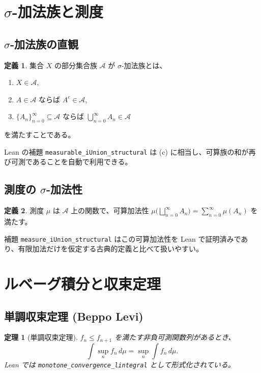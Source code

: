 \documentclass[a4paper]{ltjsarticle}
\theoremstyle{definition}
\newtheorem{definition}{定義}[section]
\theoremstyle{plain}
\newtheorem{theorem}{定理}[section]
\begin{document}
\section{$\sigma$-加法族と測度}

\subsection{$\sigma$-加法族の直観}
\begin{definition}
集合 $X$ の部分集合族 $\mathcal{A}$ が $\sigma$-加法族とは、
\begin{enumerate}[label=\textup{(\alph*)}]
  \item $X \in \mathcal{A}$,
  \item $A \in \mathcal{A}$ ならば $A^c \in \mathcal{A}$,
  \item $\{A_n\}_{n=0}^\infty \subseteq \mathcal{A}$ ならば $\bigcup_{n=0}^\infty A_n \in \mathcal{A}$
\end{enumerate}
を満たすことである。
\end{definition}

Lean の補題 \texttt{measurable\_iUnion\_structural} は (c) に相当し、可算族の和が再び可測であることを自動で利用できる。

\subsection{測度の $\sigma$-加法性}
\begin{definition}
測度 $\mu$ は $\mathcal{A}$ 上の関数で、可算加法性
$\mu\bigl(\bigsqcup_{n=0}^\infty A_n\bigr)=\sum_{n=0}^\infty \mu(A_n)$
を満たす。
\end{definition}
補題 \texttt{measure\_iUnion\_structural} はこの可算加法性を Lean で証明済みであり、有限加法だけを仮定する古典的定義と比べて扱いやすい。

\section{ルベーグ積分と収束定理}

\subsection{単調収束定理 (Beppo Levi)}
\begin{theorem}[単調収束定理]
$f_n \le f_{n+1}$ を満たす非負可測関数列があるとき、
\[
\int \sup_{n} f_n \, d\mu = \sup_{n} \int f_n \, d\mu.
\]
Lean では \texttt{monotone\_convergence\_lintegral} として形式化されている。
\end{theorem}
\end{document}
